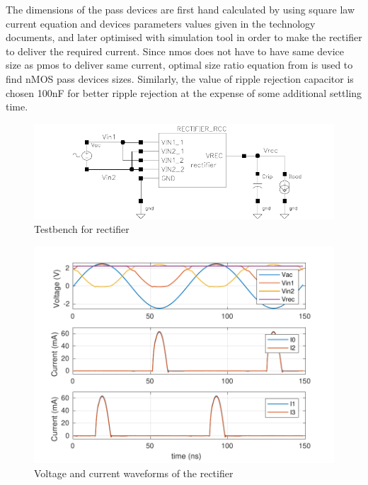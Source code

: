 \documentclass[12pt,a4paper,UKenglish]{article}
\begin{document}
The dimensions of the pass devices are first hand calculated by using square law current equation and devices parameters values given in the technology documents, and later optimised with simulation tool in order to make the rectifier to deliver the required current. Since \acrshort{nmos} does not have to have same device size as \acrshort{pmos} to deliver same current, optimal size ratio equation from \cite{rectsize} is used to find nMOS pass devices sizes.
Similarly, the value of ripple rejection capacitor is chosen 100nF for better ripple rejection at the expense of some additional settling time. \\

\begin{figure}[htbp] %
   \centering
   \includegraphics[width=\textwidth]{img/rectifier_testbench.pdf} 
   \caption{Testbench for rectifier}
   \label{rect_tb}
\end{figure}

\begin{figure}[H] %
   \centering
   \includegraphics[width=\textwidth]{img/rectifier_VI.pdf} 
   \caption{Voltage and current waveforms of the rectifier}
   \label{rect_plot}
\end{figure}
\end{document}
